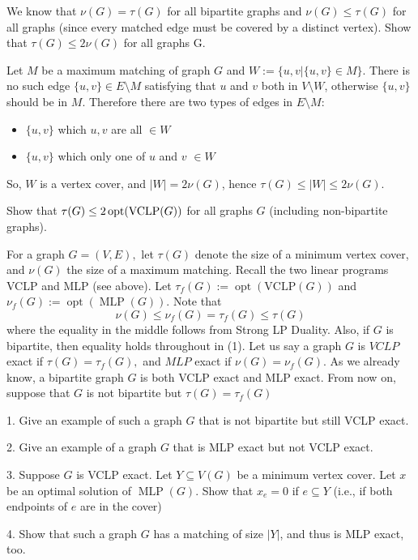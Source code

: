 \documentclass[11pt,a4paper,oneside]{article}
\newcommand{\opt}{\textup{\textrm{opt}}}
\begin{document}
\begin{problem}{2}
  \statement
 We know that $\nu(G) = \tau(G)$ for all bipartite graphs 
        and $\nu(G) \leq \tau(G)$ for all graphs (since every matched edge must
        be covered by a distinct vertex). Show that $\tau(G) \leq 2 \nu(G)$ for all graphs G.
  
  \solution
  
  Let \(M\) be a maximum matching of graph \(G\) and \(W := \{u, v | \{u, v\} \in M\}\). There is no such edge \(\{u, v\} \in E \setminus M\) satisfying that \(u\) and \(v\) both in \(V \setminus W\), otherwise \(\{u, v\}\) should be in \(M\). Therefore there are two types of edges in \(E \setminus M\):
  
  \begin{itemize}
  	\item \(\{u, v\}\) which \(u, v\) are all \(\in W\)
  	\item \(\{u, v\}\) which only one of \(u\) and \(v\) \(\in W\)
  \end{itemize}

	So, \(W\) is a vertex cover, and \(|W| = 2\nu(G)\), hence \(\tau(G) \leq |W| \leq 2\nu(G)\).
\end{problem}


\begin{problem}{3}
	\statement
     Show that $\tau(G) \leq 2\, \opt(\textrm{VCLP}(G))$ for all graphs $G$ (including non-bipartite graphs).
  
    \solution
    
\end{problem}




\begin{problem}{4}
	\statement
    For a graph $G=(V, E),$ let $\tau(G)$ denote the size of a minimum vertex cover, and $\nu(G)$ the size of a maximum matching. Recall the two linear programs VCLP and MLP (see above). Let $\tau_{f}(G):=\operatorname{opt}(\mathrm{VCLP}(G))$ and $\nu_{f}(G):=\operatorname{opt}(\operatorname{MLP}(G)) .$ Note that
		\[
		\nu(G) \leq \nu_{f}(G)=\tau_{f}(G) \leq \tau(G)
		\]
		where the equality in the middle follows from Strong LP Duality. Also, if $G$ is bipartite, then equality holds throughout in (1). Let us say a graph $G$ is $V C L P$ exact if $\tau(G)=\tau_{f}(G),$ and $M L P$ exact if $\nu(G)=\nu_{f}(G) .$ As we already know, a bipartite graph $G$ is both VCLP exact and MLP exact. From now on, suppose that $G$ is not bipartite but $\tau(G)=\tau_{f}(G)$
		
		1. Give an example of such a graph $G$ that is not bipartite but still VCLP exact.
		
		2. Give an example of a graph $G$ that is MLP exact but not VCLP exact.
		
		3. Suppose $G$ is VCLP exact. Let $Y \subseteq V(G)$ be a minimum vertex cover. Let $x$ be an optimal solution of $\operatorname{MLP}(G) .$ Show that $x_{e}=0$ if $e \subseteq Y$ (i.e., if both endpoints of $e$ are in the cover)
		
		4. Show that such a graph $G$ has a matching of size $|Y|$, and thus is MLP exact, too.
    
    \solution
\end{problem}
\end{document}
